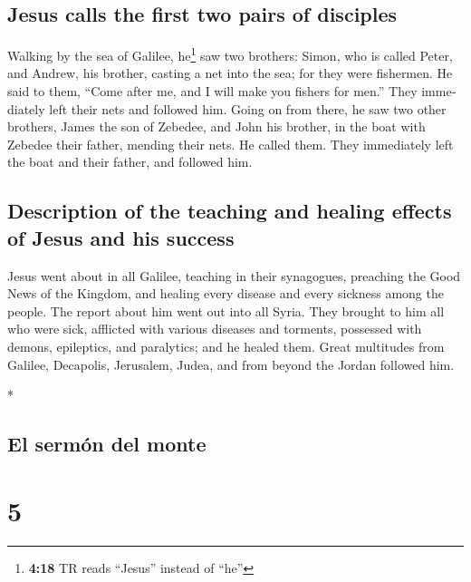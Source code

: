 \begin{paracol}{2}
\begin{otherlanguage}{english}
\hypertarget{jesus-calls-the-first-two-pairs-of-disciples}{%
\subsection{Jesus calls the first two pairs of
disciples}\label{jesus-calls-the-first-two-pairs-of-disciples}}

 Walking by the sea of Galilee, he\footnote{\textbf{4:18}
  TR reads ``Jesus'' instead of ``he''} saw two brothers: Simon, who is
called Peter, and Andrew, his brother, casting a net into the sea; for
they were fishermen.  He said to them, ``Come after me,
and I will make you fishers for men.''  They immediately
left their nets and followed him.  Going on from there,
he saw two other brothers, James the son of Zebedee, and John his
brother, in the boat with Zebedee their father, mending their nets. He
called them.  They immediately left the boat and their
father, and followed him.

\hypertarget{description-of-the-teaching-and-healing-effects-of-jesus-and-his-success}{%
\subsection{Description of the teaching and healing effects of Jesus and
his
success}\label{description-of-the-teaching-and-healing-effects-of-jesus-and-his-success}}

 Jesus went about in all Galilee, teaching in their
synagogues, preaching the Good News of the Kingdom, and healing every
disease and every sickness among the people.  The report
about him went out into all Syria. They brought to him all who were
sick, afflicted with various diseases and torments, possessed with
demons, epileptics, and paralytics; and he healed them. 
Great multitudes from Galilee, Decapolis, Jerusalem, Judea, and from
beyond the Jordan followed him.

\end{otherlanguage}

\switchcolumn[0]*

\hypertarget{el-sermuxf3n-del-monte}{%
\subsection{El sermón del monte}\label{el-sermuxf3n-del-monte}}

\hypertarget{section-8}{%
\section{5}\label{section-8}}


\end{paracol}
